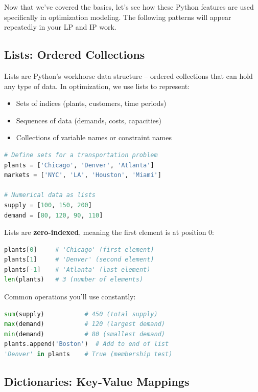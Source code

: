 Now that we've covered the basics, let's see how these Python features are used specifically in optimization modeling. The following patterns will appear repeatedly in your LP and IP work.

\subsection{Lists: Ordered Collections}

Lists are Python's workhorse data structure -- ordered collections that can hold any type of data. In optimization, we use lists to represent:
\begin{itemize}
\item Sets of indices (plants, customers, time periods)
\item Sequences of data (demands, costs, capacities)
\item Collections of variable names or constraint names
\end{itemize}

\begin{lstlisting}[language=Python]
# Define sets for a transportation problem
plants = ['Chicago', 'Denver', 'Atlanta']
markets = ['NYC', 'LA', 'Houston', 'Miami']

# Numerical data as lists
supply = [100, 150, 200]
demand = [80, 120, 90, 110]
\end{lstlisting}

Lists are \textbf{zero-indexed}, meaning the first element is at position 0:

\begin{lstlisting}[language=Python]
plants[0]     # 'Chicago' (first element)
plants[1]     # 'Denver' (second element)
plants[-1]    # 'Atlanta' (last element)
len(plants)   # 3 (number of elements)
\end{lstlisting}

Common operations you'll use constantly:

\begin{lstlisting}[language=Python]
sum(supply)           # 450 (total supply)
max(demand)           # 120 (largest demand)
min(demand)           # 80 (smallest demand)
plants.append('Boston')  # Add to end of list
'Denver' in plants    # True (membership test)
\end{lstlisting}

\subsection{Dictionaries: Key-Value Mappings}

